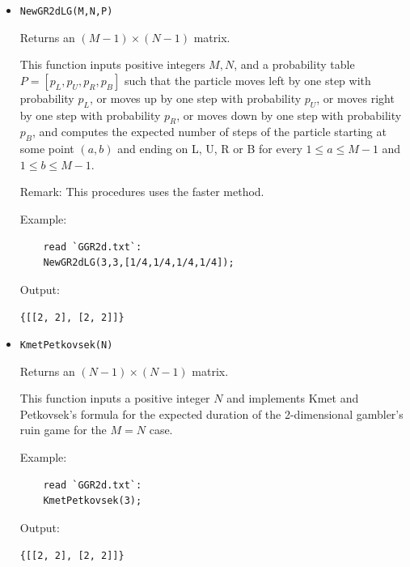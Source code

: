 \documentclass[reqno]{amsart}
\theoremstyle{definition}
\theoremstyle{definition}
\theoremstyle{remark}
\begin{document}
\begin{itemize}
    Remark: This procedures uses the faster method. 
    
    Example:
    
    \begin{lstlisting}
    read `GGR2d.txt`:
    NewGR2dPG(3,3,L,U,R,B,[1/4,1/4,1/4,1/4]);
    \end{lstlisting}
    Output:
    
    \lstinline!{[[R/8 + (3L)/8 + U/8 + (3B)/8, R/8 + (3L)/8 + (3U)/8 + B/8], [(3R)/8 + L/8 + U/8 + (3B)/8, (3R)/8 + L/8 + (3U)/8 + B/8]]}!
    \item \lstinline{NewGR2dLG(M,N,P)}

    Returns an $(M-1) \times (N-1)$ matrix.
    
    This function inputs positive integers $M, N$, and a probability table $P=[p_L,p_U,p_R,p_B]$ such that the particle moves left by one step with probability $p_L$, or moves up by one step with probability $p_U$, or moves right by one step with probability $p_R$, or moves down by one step with probability $p_B$, and computes the expected number of steps of the particle starting at some point $(a,b)$ and ending on L, U, R or B for every $1\leq a \leq M-1$ and $1\leq b \leq M-1$.

    Remark: This procedures uses the faster method. 
    
    Example:
    
    \begin{lstlisting}
    read `GGR2d.txt`:
    NewGR2dLG(3,3,[1/4,1/4,1/4,1/4]);
    \end{lstlisting}
    Output:
    
    \lstinline!{[[2, 2], [2, 2]]}!


 
     \item \lstinline{KmetPetkovsek(N)}

    Returns an $(N-1) \times (N-1)$ matrix.
    
    This function inputs a positive integer $N$ and implements Kmet and Petkovsek's formula for the expected duration of the 2-dimensional gambler's ruin game for the $M=N$ case. 
    
    Example:
    
    \begin{lstlisting}
    read `GGR2d.txt`:
    KmetPetkovsek(3);
    \end{lstlisting}
    Output:
    
    \lstinline!{[[2, 2], [2, 2]]}!
\end{itemize}
\end{document}
